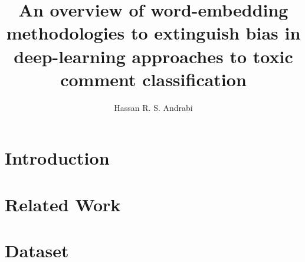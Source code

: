 \documentclass{article}
\title{An overview of word-embedding methodologies to extinguish bias in deep-learning approaches to toxic comment classification}
\author{Hassan R. S. Andrabi}
\date{}
\begin{document}
\maketitle

\begin{abstract}

\end{abstract}

\section{Introduction}\label{sec:introduction}


\section{Related Work}\label{sec:related-work}


\section{Dataset}\label{sec:dataset}


\newpage



\end{document}

